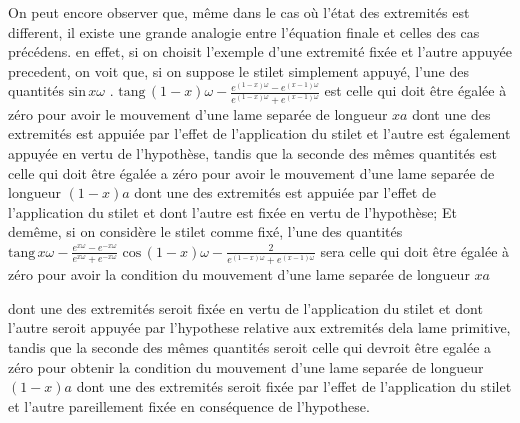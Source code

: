 \documentclass[11pt,a4paper]{article}
\begin{document}
On peut encore observer que, même dans le cas où l'état des extremités est
different, il existe une grande analogie entre l'équation finale et celles
des cas précédens. en effet, si on choisit l'exemple d'une extremité fixée
et l'autre appuyée  precedent, on voit que, si on suppose le stilet
simplement appuyé, l'une des quantités $\text{sin}\,x\omega$ . $\text{tang}\,(1-x)\omega - \frac{e^{(1-x)\omega} - e^{(x-1)\omega}}{e^{(1-x)\omega} + e^{(x-1)\omega}}$
est celle qui doit être égalée à zéro pour avoir le mouvement d'une lame
separée de longueur $xa$ dont une des extremités est appuiée par l'effet de
l'application du stilet et  l'autre est également appuyée en vertu de l'hypothèse,
tandis que la seconde des mêmes quantités est celle qui doit être égalée
a zéro pour avoir le mouvement d'une lame separée de longueur $(1-x)a$
dont une des extremités est appuiée par l'effet de l'application du stilet
et dont l'autre est fixée en vertu de l'hypothèse; Et demême, si on
considère le stilet comme fixé, l'une des quantités $\text{tang}\,x\omega - \frac{e^{x\omega} - e^{-x\omega}}{e^{x\omega} + e^{-x\omega}}$
$\text{cos}\,(1-x)\omega - \frac{2}{e^{(1-x)\omega} + e^{(x-1)\omega}}$ sera celle qui doit être égalée à zéro pour avoir
la condition du mouvement d'une lame separée de longueur $xa$


dont une des extremités seroit fixée en vertu de l'application du stilet et
dont l'autre seroit appuyée par l'hypothese relative aux extremités dela
lame primitive, tandis que la seconde des mêmes quantités seroit celle qui
devroit être egalée a zéro pour obtenir la condition du mouvement d'une
lame separée de longueur $(1-x)a$ dont une des extremités seroit fixée
par l'effet de l'application du stilet et l'autre pareillement fixée en
conséquence de l'hypothese.
\end{document}

